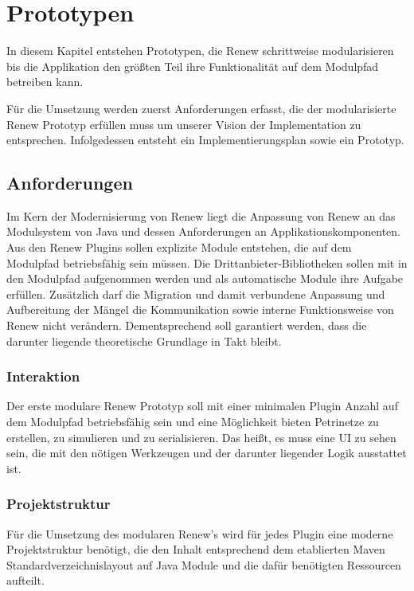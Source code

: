 \chapter{Prototypen} 
In diesem Kapitel entstehen Prototypen, die Renew schrittweise modularisieren bis die Applikation den größten Teil ihre Funktionalität auf dem Modulpfad betreiben kann. 


Für die Umsetzung werden zuerst Anforderungen erfasst, die der modularisierte Renew Prototyp erfüllen muss um unserer Vision der Implementation zu entsprechen. Infolgedessen entsteht ein Implementierungsplan sowie ein Prototyp. 

\section{Anforderungen} \label{sec:anforderungen}
Im Kern der Modernisierung von Renew liegt die Anpassung von Renew an das Modulsystem von Java und dessen Anforderungen an Applikationskomponenten. Aus den Renew Plugins sollen explizite Module entstehen, die auf dem Modulpfad betriebsfähig sein müssen. Die Drittanbieter-Bibliotheken sollen mit in den Modulpfad aufgenommen werden und als automatische Module ihre Aufgabe erfüllen. Zusätzlich darf die Migration und damit verbundene Anpassung und Aufbereitung der Mängel die Kommunikation sowie interne Funktionsweise von Renew nicht verändern. Dementsprechend soll garantiert werden, dass die darunter liegende theoretische Grundlage in Takt bleibt. 

\subsection{Interaktion}
Der erste modulare Renew Prototyp soll mit einer minimalen Plugin Anzahl auf dem Modulpfad betriebsfähig sein und eine Möglichkeit bieten Petrinetze zu erstellen, zu simulieren und zu serialisieren. Das heißt, es muss eine UI zu sehen sein, die mit den nötigen Werkzeugen und der darunter liegender Logik ausstattet ist. 

\subsection{Projektstruktur}
Für die Umsetzung des modularen Renew's wird für jedes Plugin eine moderne Projektstruktur benötigt, die den Inhalt entsprechend dem etablierten Maven Standardverzeichnislayout auf Java Module und die dafür benötigten Ressourcen aufteilt. 

